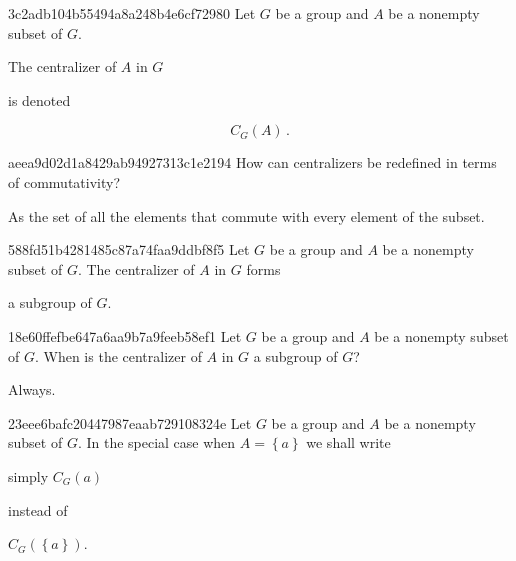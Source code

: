 \begin{note}{3c2adb104b55494a8a248b4e6cf72980}
    Let \({ G }\) be a group and \({ A }\) be a nonempty subset of \({ G }\).
    \begin{icloze}{2}The centralizer of \({ A }\) in \({ G }\)\end{icloze} is denoted
    \begin{icloze}{1}
        \[
            C_G(A)\,.
        \]
    \end{icloze}
\end{note}

\begin{note}{aeea9d02d1a8429ab94927313c1e2194}
    How can centralizers be redefined in terms of commutativity?

    \begin{cloze}{1}
        As the set of all the elements that commute with every element of the subset.
    \end{cloze}
\end{note}

\begin{note}{588fd51b4281485c87a74faa9ddbf8f5}
    Let \({ G }\) be a group and \({ A }\) be a nonempty subset of \({ G }\).
    The centralizer of \({ A }\) in \({ G }\) forms \begin{icloze}{1}a subgroup of \({ G }\).\end{icloze}
\end{note}

\begin{note}{18e60ffefbe647a6aa9b7a9feeb58ef1}
    Let \({ G }\) be a group and \({ A }\) be a nonempty subset of \({ G }\).
    When is the centralizer of \({ A }\) in \({ G }\) a subgroup of \({ G }\)?

    \begin{cloze}{1}
        Always.
    \end{cloze}
\end{note}

\begin{note}{23eee6bafc20447987eaab729108324e}
    Let \({ G }\) be a group and \({ A }\) be a nonempty subset of \({ G }\).
    In the special case when \({ A = \left\{ a \right\} }\) we shall write \begin{icloze}{1}simply \({ C_{G}(a) }\)\end{icloze} instead of \begin{icloze}{2}\({ C_{G}(\left\{ a \right\}) }\).\end{icloze}
\end{note}


